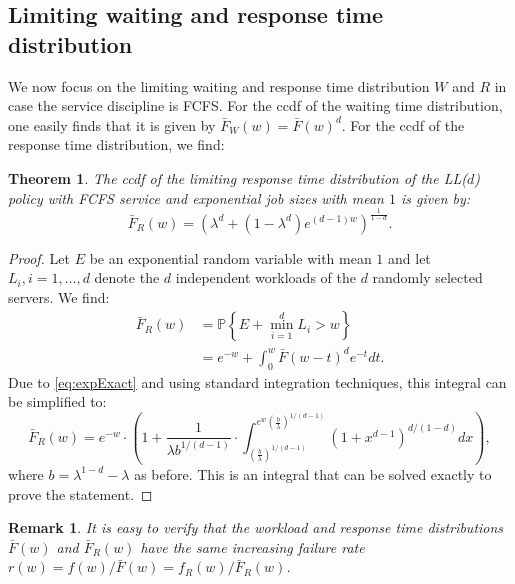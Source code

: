 \documentclass[12pt]{report}
\renewcommand{\P}{\mathbb{P}}
\renewcommand{\P}{\mathbb{P}}
\newtheorem{theorem}{Theorem}
\newtheorem{remark}{Remark}
\begin{document}
\subsection{Limiting waiting and response time distribution}
We now focus on the limiting waiting and response time distribution $W$ and $R$ in case the service discipline is FCFS. For the ccdf of the waiting time distribution, one easily finds that it is given by $\bar F_W(w) = \bar F(w)^d$. For the ccdf of the response time distribution, we find:

\begin{theorem}
The ccdf of the limiting response time distribution of the LL($d$) policy with
FCFS service and exponential job sizes with mean $1$ is given by:
\begin{equation}\label{eq:FR}
\bar{F}_R(w) = \left( \lambda^d + (1 -\lambda^d) e^{(d-1)w} \right)^{\frac{1}{1-d}}.
\end{equation}
\end{theorem}
\begin{proof}
Let $E$ be an exponential random variable with mean $1$ and let $L_i,i = 1,\dots, d$ denote the $d$ independent workloads of the
$d$ randomly selected servers. We find:
\begin{align*}
\bar{F}_R(w)
&= \P\left\{E + \min_{i=1}^d L_i > w\right\}\\
&= e^{-w} + \int_0^{w} \bar{F}(w-t)^d e^{-t} dt.
\end{align*}
Due to \eqref{eq:expExact} and using standard integration techniques, this integral can be simplified to:
$$
\bar{F}_R(w) = e^{-w} \cdot \left(1 + \frac{1}{\lambda b^{1/(d-1)}} \cdot \int_{\left(\frac{b}{\lambda}\right)^{1/(d-1)}}^{e^w \left(\frac{b}{\lambda}\right)^{1/(d-1)} } (1 + x^{d-1})^{d/(1-d)} dx \right),
$$
where $b= \lambda^{1-d} - \lambda$ as before.
This is an integral that can be solved exactly to prove the statement. 
\end{proof}

\begin{remark}
It is easy to verify that the workload and response time distributions $\bar F(w)$ and $\bar F_R(w)$ have 
the same increasing failure rate $r(w) = f(w)/\bar{F}(w) = f_R(w)/\bar{F}_R(w)$.
\end{remark}
\end{document}
